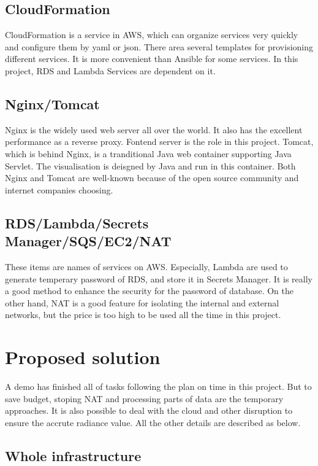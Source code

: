 \documentclass[conference]{IEEEtran}
\begin{document}
\subsection{CloudFormation}

CloudFormation is a service in AWS, which can organize services very quickly and configure them by yaml or json. There area
several templates for provisioning different services. It is more convenient than Ansible for some services. In this project, 
RDS and Lambda Services are dependent on it.

\subsection{Nginx/Tomcat}

Nginx is the widely used web server all over the world. It also has the excellent performance as a reverse proxy. 
Fontend server is the role in this project. Tomcat, which is behind Nginx, is a tranditional Java web container supporting 
Java Servlet. The visualisation is deisgned by Java and run in this container. Both Nginx and Tomcat are well-known because of 
the open source community and internet companies choosing.

\subsection{RDS/Lambda/Secrets Manager/SQS/EC2/NAT}

These items are names of services on AWS. Especially, Lambda are used to generate temperary password of RDS, and store it in 
Secrets Manager. It is really a good method to enhance the security for the password of database. On the other hand, NAT is a 
good feature for isolating the internal and external networks, but the price is too high to be used all the time in this project.

\section{Proposed solution}

A demo has finished all of tasks following the plan on time in this project. But to save budget, stoping NAT and processing parts of data are 
the temporary approaches. It is also possible to deal with the cloud and other disruption to ensure the accrute radiance value. All the 
other details are described as below.

\subsection{Whole infrastructure}
\end{document}
